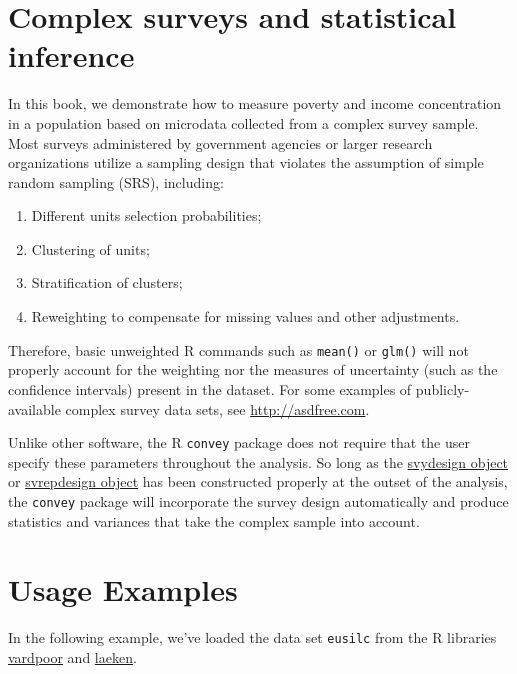 \documentclass[]{book}
\providecommand{\tightlist}{%
  \setlength{\itemsep}{0pt}\setlength{\parskip}{0pt}}
\theoremstyle{definition}
\theoremstyle{definition}
\theoremstyle{remark}
\begin{document}
\section{Complex surveys and statistical inference}\label{survey}

In this book, we demonstrate how to measure poverty and income
concentration in a population based on microdata collected from a
complex survey sample. Most surveys administered by government agencies
or larger research organizations utilize a sampling design that violates
the assumption of simple random sampling (SRS), including:

\begin{enumerate}
\def\labelenumi{\arabic{enumi}.}
\tightlist
\item
  Different units selection probabilities;
\item
  Clustering of units;
\item
  Stratification of clusters;
\item
  Reweighting to compensate for missing values and other adjustments.
\end{enumerate}

Therefore, basic unweighted R commands such as \texttt{mean()} or
\texttt{glm()} will not properly account for the weighting nor the
measures of uncertainty (such as the confidence intervals) present in
the dataset. For some examples of publicly-available complex survey data
sets, see \href{}{http://asdfree.com}.

Unlike other software, the R \texttt{convey} package does not require
that the user specify these parameters throughout the analysis. So long
as the
\href{http://r-survey.r-forge.r-project.org/survey/html/svydesign.html}{svydesign
object} or
\href{http://r-survey.r-forge.r-project.org/survey/html/svrepdesign.html}{svrepdesign
object} has been constructed properly at the outset of the analysis, the
\texttt{convey} package will incorporate the survey design automatically
and produce statistics and variances that take the complex sample into
account.

\section{Usage Examples}\label{usage-examples}

In the following example, we've loaded the data set \texttt{eusilc} from
the R libraries
\href{https://CRAN.R-project.org/package=vardpoor}{vardpoor} and
\href{https://CRAN.R-project.org/package=laeken}{laeken}.
\end{document}
